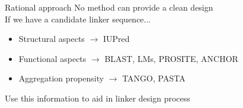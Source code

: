 \documentclass{beamer}
\begin{document}
\begin{frame}{Rational approach}
No method can provide a clean design\\ %
\vspace{5px}
\pause
If we have a candidate linker sequence...
\pause
\begin{itemize}
\item Structural aspects $\rightarrow$ IUPred \pause
\item Functional aspects $\rightarrow$ BLAST, LMs, PROSITE, ANCHOR  \pause
\item Aggregation propensity $\rightarrow$ TANGO, PASTA  
\end{itemize}




\vspace{10px}
\pause 
\Large{Use this information to aid in linker design process}



% 
% 
\end{frame}
\end{document}
